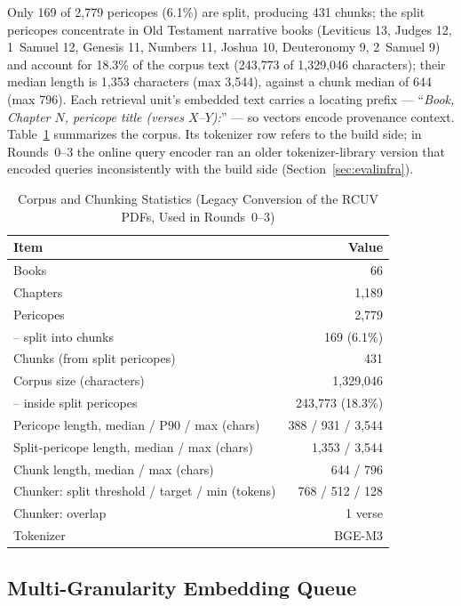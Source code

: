 Only 169 of 2{,}779 pericopes (6.1\%) are split, producing 431 chunks; the
split pericopes concentrate in Old Testament narrative books (Leviticus
13, Judges 12, 1~Samuel 12, Genesis 11, Numbers 11, Joshua 10, Deuteronomy
9, 2~Samuel 9) and account for 18.3\% of the corpus text (243{,}773 of
1{,}329{,}046 characters); their median length is 1{,}353 characters
(max 3{,}544), against a chunk median of 644 (max 796). Each retrieval
unit's embedded text carries a locating prefix ---
``\emph{Book, Chapter $N$, pericope title (verses $X$--$Y$):}'' --- so
vectors encode provenance context. Table~\ref{tab:corpus} summarizes the
corpus. Its tokenizer row refers to the build side; in Rounds~0--3 the
online query encoder ran an older tokenizer-library version that encoded
queries inconsistently with the build side (Section~\ref{sec:evalinfra}).

\begin{table}[!t]
\caption{Corpus and Chunking Statistics (Legacy Conversion of the RCUV
PDFs, Used in Rounds~0--3)}
\label{tab:corpus}
\centering
\begin{tabular}{lr}
\toprule
Item & Value \\
\midrule
Books & 66 \\
Chapters & 1{,}189 \\
Pericopes & 2{,}779 \\
\quad -- split into chunks & 169 (6.1\%) \\
Chunks (from split pericopes) & 431 \\
Corpus size (characters) & 1{,}329{,}046 \\
\quad -- inside split pericopes & 243{,}773 (18.3\%) \\
Pericope length, median / P90 / max (chars) & 388 / 931 / 3{,}544 \\
Split-pericope length, median / max (chars) & 1{,}353 / 3{,}544 \\
Chunk length, median / max (chars) & 644 / 796 \\
\midrule
Chunker: split threshold / target / min (tokens) & 768 / 512 / 128 \\
Chunker: overlap & 1 verse \\
Tokenizer & BGE-M3 \\
\bottomrule
\end{tabular}
\end{table}

\subsection{Multi-Granularity Embedding Queue}
\label{sec:queue}

